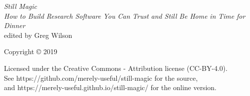 \pagestyle{empty}

{\begingroup
  \raggedleft
  \vspace*{\baselineskip}

  {\Huge\itshape Still Magic}\\[\baselineskip]

  {\large\itshape
    How to Build Research Software You Can Trust and Still Be Home in Time for Dinner
  }\\[0.2\textheight]

  {\large edited by Greg Wilson}\par

  \vfill

  {\large Copyright {\copyright} 2019}

  \vspace*{\baselineskip}


  \vspace*{\baselineskip}

  {\small
    Licensed under the Creative Commons - Attribution license (CC-BY-4.0).
    \\
    See https://github.com/merely-useful/still-magic for the source,\\
    and https://merely-useful.github.io/still-magic/ for the online version.
  }

\endgroup}

\newpage

\pagestyle{empty}

~

\newpage

\tableofcontents

\newpage

\pagestyle{empty}

~

\newpage

\pagestyle{plain}
